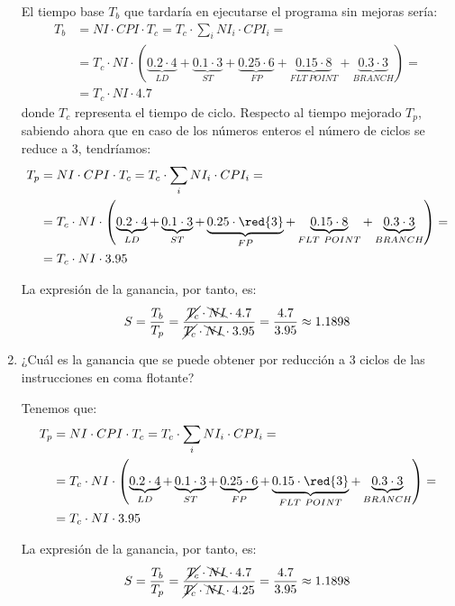 \begin{ejercicio}
\begin{enumerate}
        El tiempo base $T_b$ que tardaría en ejecutarse el programa sin mejoras sería:
        \begin{align*}
            T_b &= NI \cdot CPI \cdot T_c = T_c \cdot \sum_{i} NI_i \cdot CPI_i
            =\\&= T_c \cdot NI \cdot \left(\underbrace{0.2 \cdot 4}_{LD} + \underbrace{0.1 \cdot 3}_{ST} + \underbrace{0.25 \cdot 6}_{FP} + \underbrace{0.15 \cdot 8}_{FLT~POINT} + \underbrace{ 0.3 \cdot 3}_{BRANCH}\right) =\\&= T_c \cdot NI \cdot 4.7
        \end{align*}
        donde $T_c$ representa el tiempo de ciclo. Respecto al tiempo mejorado $T_p$, sabiendo ahora
        que en caso de los números enteros el número de ciclos se reduce a 3, tendríamos:
        \begin{align*}
            T_p &= NI \cdot CPI \cdot T_c = T_c \cdot \sum_{i} NI_i \cdot CPI_i
            =\\&= T_c \cdot NI \cdot \left(\underbrace{0.2 \cdot 4}_{LD} + \underbrace{0.1 \cdot 3}_{ST} + \underbrace{0.25 \cdot \red{3}}_{FP} + \underbrace{0.15 \cdot 8}_{FLT~POINT} + \underbrace{ 0.3 \cdot 3}_{BRANCH}\right) =\\& = T_c \cdot NI \cdot 3.95
        \end{align*}

        La expresión de la ganancia, por tanto, es:
        \begin{equation*}
            S = \dfrac{T_b}{T_p} = \dfrac{\cancel{T_c} \cdot \bcancel{NI} \cdot 4.7}{\cancel{T_c} \cdot \bcancel{NI} \cdot 3.95} = \frac{4.7}{3.95} \approx 1.1898
        \end{equation*}

        \item ¿Cuál es la ganancia que se puede obtener por reducción a 3 ciclos de las instrucciones en coma flotante?
        
        Tenemos que:
        \begin{align*}
            T_p &= NI \cdot CPI \cdot T_c = T_c \cdot \sum_{i} NI_i \cdot CPI_i
            =\\&= T_c \cdot NI \cdot \left(\underbrace{0.2 \cdot 4}_{LD} + \underbrace{0.1 \cdot 3}_{ST} + \underbrace{0.25 \cdot 6}_{FP} + \underbrace{0.15 \cdot \red{3}}_{FLT~POINT} + \underbrace{ 0.3 \cdot 3}_{BRANCH}\right) =\\&= T_c \cdot NI \cdot 3.95
        \end{align*}

        La expresión de la ganancia, por tanto, es:
        \begin{equation*}
            S = \dfrac{T_b}{T_p} = \dfrac{\cancel{T_c} \cdot \bcancel{NI} \cdot 4.7}{\cancel{T_c} \cdot \bcancel{NI} \cdot 4.25} = \frac{4.7}{3.95} \approx 1.1898
        \end{equation*}


\end{enumerate}
\end{ejercicio}

